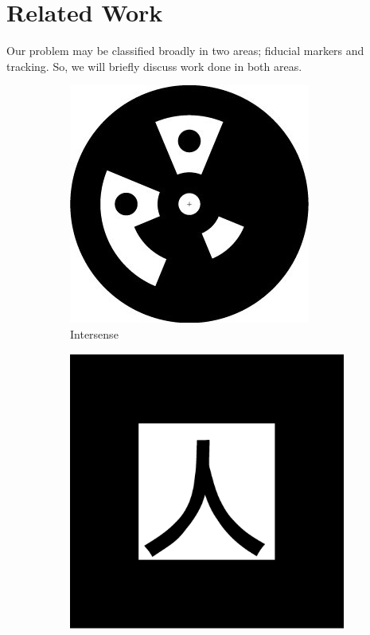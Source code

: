 \documentclass[runningheads]{llncs}
\begin{document}
\section{Related Work}
Our problem may be classified broadly in two areas; fiducial markers and
tracking. So, we will briefly discuss work done in both areas.
\begin{figure}
 \begin{subfigure}[b]{0.19\textwidth}
  \centering
  \includegraphics[width=\linewidth]{intersense.jpg}
  Intersense\cite{NaimarkF02}  
 \end{subfigure}
 \begin{subfigure}[b]{0.19\textwidth}  
 \centering 
  \includegraphics[width=\linewidth]{pattKanji.pdf}

\end{subfigure}
\end{figure}
\end{document}
